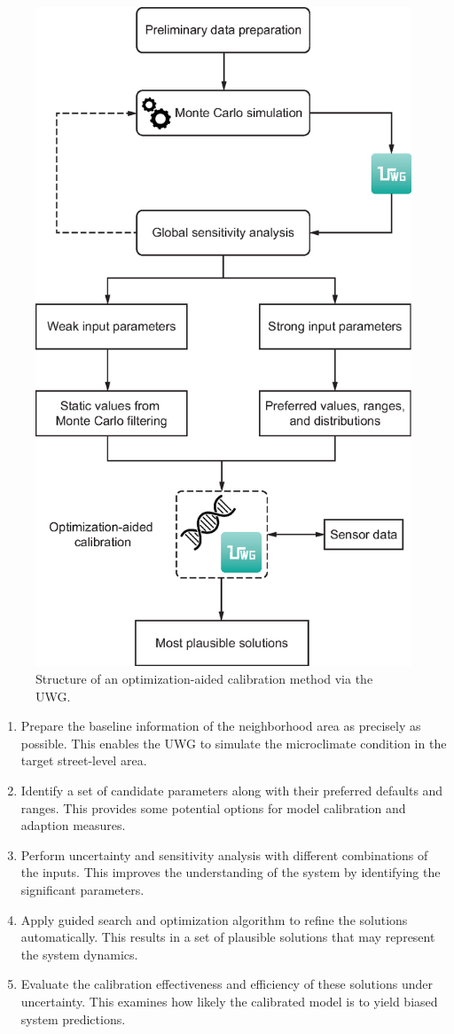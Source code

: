 \begin{figure}[h]
\centering
\includegraphics[width=.53\linewidth]{Figure4-2.eps}
\caption{Structure of an optimization-aided calibration method via the UWG.}
\end{figure}

\begin{enumerate}
  \item Prepare the baseline information of the neighborhood area as precisely as possible. This enables the UWG to simulate the microclimate condition in the target street-level area.
  \item Identify a set of candidate parameters along with their preferred defaults and ranges. This provides some potential options for model calibration and adaption measures.
  \item Perform uncertainty and sensitivity analysis with different combinations of the inputs. This improves the understanding of the system by identifying the significant parameters.
  \item Apply guided search and optimization algorithm to refine the solutions automatically. This results in a set of plausible solutions that may represent the system dynamics.
  \item Evaluate the calibration effectiveness and efficiency of these solutions under uncertainty. This examines how likely the calibrated model is to yield biased system predictions.
\end{enumerate}

